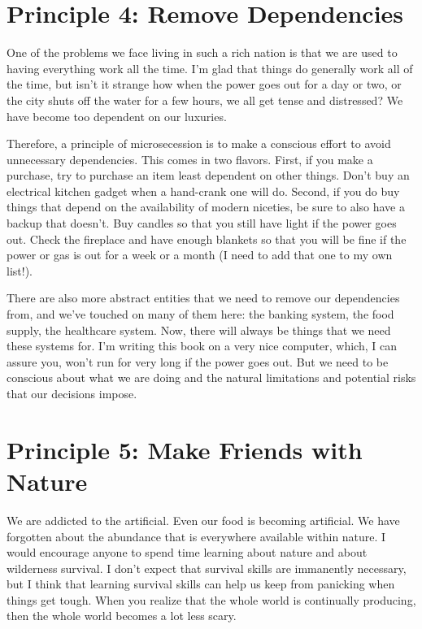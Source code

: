 \section{Principle 4: Remove Dependencies}

One of the problems we face living in such a rich nation is that we are
used to having everything work all the time. I'm glad
that things do generally work all of the time, but
isn't it strange how when the power goes out for a day
or two, or the city shuts off the water for a few hours, we all get
tense and distressed? We have become too dependent on our luxuries.

Therefore, a principle of microsecession is to make a conscious effort
to avoid unnecessary dependencies. This comes in two flavors. First, if
you make a purchase, try to purchase an item least dependent on other
things. Don't buy an electrical kitchen gadget when a
hand-crank one will do. Second, if you do buy things that depend on the
availability of modern niceties, be sure to also have a backup that
doesn't. Buy candles so that you still have light if
the power goes out. Check the fireplace and have enough blankets so
that you will be fine if the power or gas is out for a week or a month
(I need to add that one to my own list!).

There are also more abstract entities that we need to remove our
dependencies from, and
we’ve touched on many of them here: the banking system, the food
supply, the healthcare system. Now, there will always be things that
we need these systems for. I'm writing this book on a
very nice computer, which, I can assure you, won't run
for very long if the power goes out. But we need to be conscious about
what we are doing and the natural limitations and potential risks that
our decisions
impose.

\section{Principle 5: Make Friends with Nature}

We are addicted to the artificial. Even our food is becoming artificial.
We have forgotten about the abundance that is everywhere available
within nature. I would encourage anyone to spend time learning about
nature and about wilderness survival. I don't expect
that survival skills are immanently necessary, but I think that
learning survival skills can help us
keep from panicking
when things get tough. When you realize that the whole world is
continually producing, then the whole world becomes a lot less scary.

